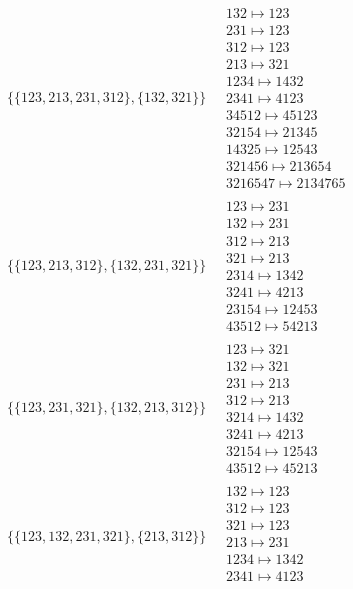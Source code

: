 \begin{scriptsize}
\begin{align}
\\
\{\{123, 213, 231, 312\}, \{132, 321\}\}
\ 
&
\begin{matrix}
132 \mapsto 123
\\
231 \mapsto 123
\\
312 \mapsto 123
\\
213 \mapsto 321
\\
1234 \mapsto 1432
\\
2341 \mapsto 4123
\\
34512 \mapsto 45123
\\
32154 \mapsto 21345
\\
14325 \mapsto 12543
\\
321456 \mapsto 213654
\\
3216547 \mapsto 2134765
\end{matrix}
\\
\{\{123, 213, 312\}, \{132, 231, 321\}\}
\ 
&
\begin{matrix}
123 \mapsto 231
\\
132 \mapsto 231
\\
312 \mapsto 213
\\
321 \mapsto 213
\\
2314 \mapsto 1342
\\
3241 \mapsto 4213
\\
23154 \mapsto 12453
\\
43512 \mapsto 54213
\end{matrix}
\\
\{\{123, 231, 321\}, \{132, 213, 312\}\}
\ 
&
\begin{matrix}
123 \mapsto 321
\\
132 \mapsto 321
\\
231 \mapsto 213
\\
312 \mapsto 213
\\
3214 \mapsto 1432
\\
3241 \mapsto 4213
\\
32154 \mapsto 12543
\\
43512 \mapsto 45213
\end{matrix}
\\
\{\{123, 132, 231, 321\}, \{213, 312\}\}
\ 
&
\begin{matrix}
132 \mapsto 123
\\
312 \mapsto 123
\\
321 \mapsto 123
\\
213 \mapsto 231
\\
1234 \mapsto 1342
\\
2341 \mapsto 4123
\\

\end{matrix}
\end{align}
\end{scriptsize}
